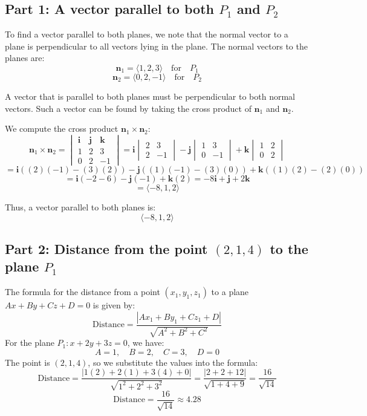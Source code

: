 \documentclass[11pt]{article}
\begin{document}
\subsection{Part 1: A vector parallel to both \( P_1 \) and \( P_2 \)}

To find a vector parallel to both planes, we note that the normal vector to a plane is perpendicular to all vectors lying in the plane. The normal vectors to the planes are:
\[
\mathbf{n}_1 = \langle 1, 2, 3 \rangle \quad \text{for} \quad P_1
\]
\[
\mathbf{n}_2 = \langle 0, 2, -1 \rangle \quad \text{for} \quad P_2
\]

A vector that is parallel to both planes must be perpendicular to both normal vectors. Such a vector can be found by taking the cross product of \( \mathbf{n}_1 \) and \( \mathbf{n}_2 \).

We compute the cross product \( \mathbf{n}_1 \times \mathbf{n}_2 \):
\[
\mathbf{n}_1 \times \mathbf{n}_2 = \begin{vmatrix} \mathbf{i} & \mathbf{j} & \mathbf{k} \\ 1 & 2 & 3 \\ 0 & 2 & -1 \end{vmatrix}
= \mathbf{i} \begin{vmatrix} 2 & 3 \\ 2 & -1 \end{vmatrix} - \mathbf{j} \begin{vmatrix} 1 & 3 \\ 0 & -1 \end{vmatrix} + \mathbf{k} \begin{vmatrix} 1 & 2 \\ 0 & 2 \end{vmatrix}
\]
\[
= \mathbf{i} \left( (2)(-1) - (3)(2) \right) - \mathbf{j} \left( (1)(-1) - (3)(0) \right) + \mathbf{k} \left( (1)(2) - (2)(0) \right)
\]
\[
= \mathbf{i}(-2 - 6) - \mathbf{j}(-1) + \mathbf{k}(2)
= -8\mathbf{i} + \mathbf{j} + 2\mathbf{k}
\]
\[
= \langle -8, 1, 2 \rangle
\]

Thus, a vector parallel to both planes is:
\[
\langle -8, 1, 2 \rangle
\]

\newpage

\subsection{Part 2: Distance from the point \( (2, 1, 4) \) to the plane \( P_1 \)}

The formula for the distance from a point \( (x_1, y_1, z_1) \) to a plane \( Ax + By + Cz + D = 0 \) is given by:
\[
\text{Distance} = \frac{|Ax_1 + By_1 + Cz_1 + D|}{\sqrt{A^2 + B^2 + C^2}}
\]
For the plane \( P_1: x + 2y + 3z = 0 \), we have:
\[
A = 1, \quad B = 2, \quad C = 3, \quad D = 0
\]
The point is \( (2, 1, 4) \), so we substitute the values into the formula:
\[
\text{Distance} = \frac{|1(2) + 2(1) + 3(4) + 0|}{\sqrt{1^2 + 2^2 + 3^2}}
= \frac{|2 + 2 + 12|}{\sqrt{1 + 4 + 9}} = \frac{16}{\sqrt{14}}
\]
\[
\text{Distance} = \frac{16}{\sqrt{14}} \approx 4.28
\]
\end{document}
